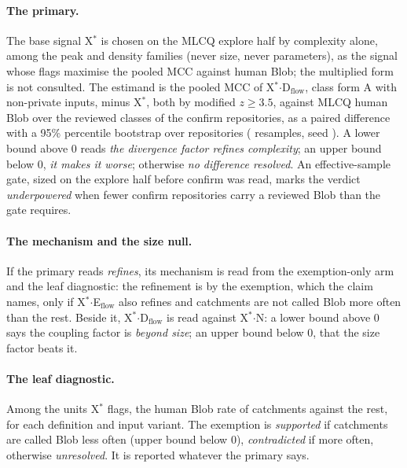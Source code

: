 \documentclass[11pt,a4paper]{article}
\newcommand{\madz}{modified $z \geq 3.5$}
\newcommand{\Xs}{X$^*$}
\newcommand{\Dflow}{D$_{\text{flow}}$}
\newcommand{\Eflow}{E$_{\text{flow}}$}
\begin{document}
\paragraph{The primary.} The base signal \Xs{} is chosen on the MLCQ explore
half by complexity alone, among the peak and density families (never size,
never parameters), as the signal whose flags maximise the pooled MCC
against human Blob; the multiplied form is not consulted. The estimand is
the pooled MCC of \Xs$\cdot$\Dflow{}, class form A with non-private inputs,
minus \Xs{}, both by \madz{}, against MLCQ human Blob over the reviewed
classes of the confirm repositories, as a paired difference with a 95\%
percentile bootstrap over repositories (\bootB{} resamples, seed
\bootSeed{}). A lower bound above 0 reads \emph{the divergence factor
refines complexity}; an upper bound below 0, \emph{it makes it worse};
otherwise \emph{no difference resolved}. An effective-sample gate, sized on
the explore half before confirm was read, marks the verdict
\emph{underpowered} when fewer confirm repositories carry a reviewed Blob
than the gate requires.

\paragraph{The mechanism and the size null.} If the primary reads
\emph{refines}, its mechanism is read from the exemption-only arm and the
leaf diagnostic: the refinement is by the exemption, which the claim names,
only if \Xs$\cdot$\Eflow{} also refines and catchments are not called Blob
more often than the rest. Beside it, \Xs$\cdot$\Dflow{} is read against
\Xs$\cdot$N: a lower bound above 0 says the coupling factor is
\emph{beyond size}; an upper bound below 0, that the size factor beats it.

\paragraph{The leaf diagnostic.} Among the units \Xs{} flags, the human
Blob rate of catchments against the rest, for each definition and input
variant. The exemption is \emph{supported} if catchments are called Blob
less often (upper bound below 0), \emph{contradicted} if more often,
otherwise \emph{unresolved}. It is reported whatever the primary says.
\end{document}
